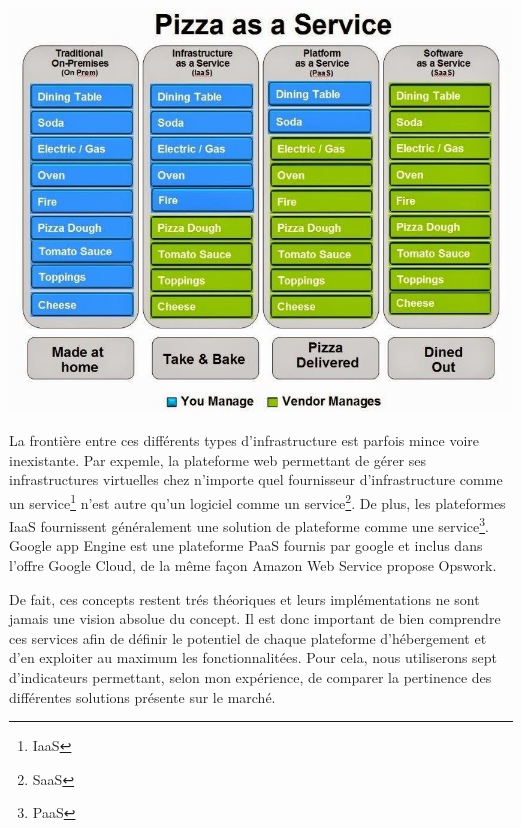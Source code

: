 \documentclass[11pt, a4paper ]{article}
\begin{document}
\includegraphics[width=\textwidth]{images/PizzaasaService.jpg}


La frontière entre ces différents types d'infrastructure est parfois mince voire inexistante. Par expemle, la plateforme web permettant de gérer ses infrastructures virtuelles chez n'importe quel fournisseur d'infrastructure comme un service\footnote{IaaS} n'est autre qu'un logiciel comme un service\footnote{SaaS}. De plus, les plateformes IaaS fournissent généralement une solution de plateforme comme une service\footnote{PaaS}. Google app Engine est une plateforme PaaS fournis par google et inclus dans l'offre Google Cloud, de la même façon Amazon Web Service propose Opswork.

De fait, ces concepts restent trés théoriques et leurs implémentations ne sont jamais une vision absolue du concept. Il est donc important de bien comprendre ces services afin de définir le potentiel de chaque plateforme d'hébergement et d'en exploiter au maximum les fonctionnalitées.
Pour cela, nous utiliserons sept d'indicateurs permettant, selon mon expérience, de comparer la pertinence des différentes solutions présente sur le marché.
\end{document}
